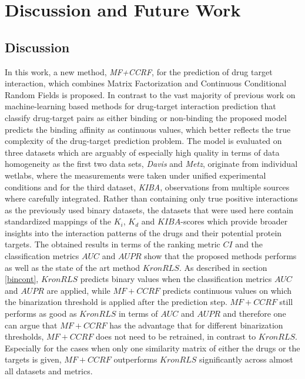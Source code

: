 \chapter{Discussion and Future Work}

\section{Discussion}

In this work, a new method, \textit{MF+CCRF}, for the prediction of drug target interaction, which combines Matrix Factorization and Continuous Conditional Random Fields is proposed. In contrast to the vast majority of previous work on machine-learning based methods for drug-target interaction prediction that classify drug-target pairs as either binding or non-binding the proposed model predicts the binding affinity as continuous values, which better reflects the true complexity of the drug-target prediction problem. The model is evaluated on three datasets which are arguably of especially high quality in terms of data homogeneity as the first two data sets, \textit{Davis} and \textit{Metz}, originate from individual wetlabs, where the measurements were taken under unified experimental conditions and for the third dataset, \textit{KIBA}, observations from multiple sources where carefully integrated. Rather than containing only true positive interactions as the previously used binary datasets, the datasets that were used here
contain standardized mappings of the $K_i$, $K_d$ and $KIBA$-scores which provide broader insights into the interaction patterns of the drugs and their potential protein targets. The obtained results in terms of the ranking metric $CI$ and the classification metrics $AUC$ and $AUPR$ show that the proposed methods performs as well as the state of the art method $KronRLS$. As described in section \ref{bincont}, $KronRLS$ predicts binary values when the classification metrics $AUC$ and $AUPR$ are applied, while $MF+CCRF$ predicts continuous values on which the binarization threshold is applied after the prediction step. $MF+CCRF$ still performs as good as $KronRLS$ in terms of $AUC$ and $AUPR$ and therefore one can argue that $MF+CCRF$ has the advantage that for different binarization thresholds, $MF+CCRF$ does not need to be retrained, in contrast to $KronRLS$. Especially for the cases when only one similarity matrix of either the drugs or the targets is given, $MF+CCRF$ outperforms $KronRLS$ significantly across almost all datasets and metrics. 

